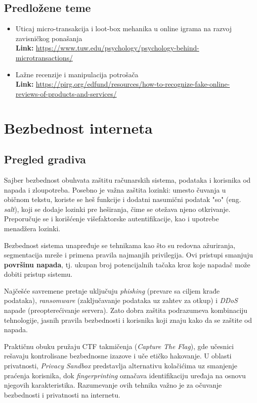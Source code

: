 \documentclass[a4paper,12pt]{article}
\begin{document}
\subsection{Predložene teme}
\begin{itemize}
  \item Uticaj micro-transakcija i loot-box mehanika u online igrama na razvoj zavisničkog ponašanja \\
  \textbf{Link:} \url{https://www.tuw.edu/psychology/psychology-behind-microtransactions/}
  \item Lažne recenzije i manipulacija potrošača \\
  \textbf{Link:} \url{https://pirg.org/edfund/resources/how-to-recognize-fake-online-reviews-of-products-and-services/}
\end{itemize}

\section{Bezbednost interneta}
\subsection{Pregled gradiva}
Sajber bezbednost obuhvata zaštitu računarskih sistema, podataka i korisnika od napada i zloupotreba. Posebno je važna zaštita lozinki: umesto čuvanja u običnom tekstu, koriste se heš funkcije i dodatni nasumični podatak "so" (eng. \emph{salt}), koji se dodaje lozinki pre heširanja, čime se otežava njeno otkrivanje. Preporučuje se i korišćenje višefaktorske autentifikacije, kao i upotrebe menadžera lozinki.

Bezbednost sistema unapređuje se tehnikama kao što su redovna ažuriranja, segmentacija mreže i primena pravila najmanjih privilegija. Ovi pristupi smanjuju \textbf{površinu napada}, tj. ukupan broj potencijalnih tačaka kroz koje napadač može dobiti pristup sistemu.

Najčešće savremene pretnje uključuju \emph{phishing} (prevare sa ciljem krađe podataka), \emph{ransomware} (zaključavanje podataka uz zahtev za otkup) i \emph{DDoS} napade (preopterećivanje servera). Zato dobra zaštita podrazumeva kombinaciju tehnologije, jasnih pravila bezbednosti i korisnika koji znaju kako da se zaštite od napada.

Praktičnu obuku pružaju CTF takmičenja (\emph{Capture The Flag}), gde učesnici rešavaju kontrolisane bezbednosne izazove i uče etičko hakovanje. U oblasti privatnosti, \emph{Privacy Sandbox} predstavlja alternativu kolačićima uz smanjenje praćenja korisnika, dok \emph{fingerprinting} označava identifikaciju uređaja na osnovu njegovih karakteristika. Razumevanje ovih tehnika važno je za očuvanje bezbednosti i privatnosti na internetu.
\end{document}
